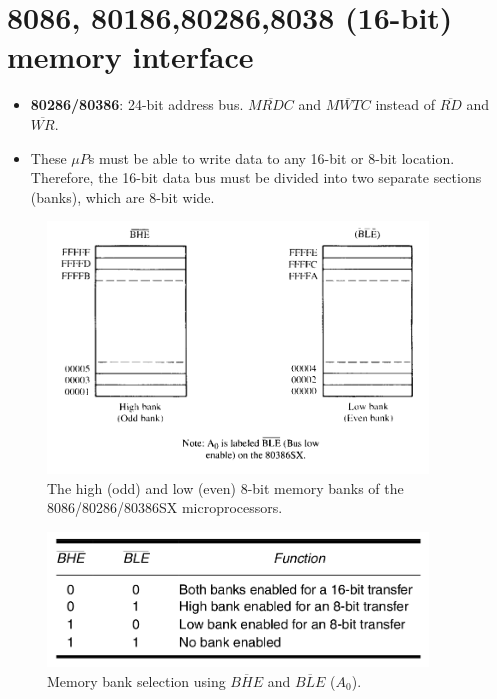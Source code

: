 \section{8086, 80186,80286,8038 (16-bit) memory interface}
\begin{itemize}
  \item \textbf{80286/80386}: 24-bit address bus. $\overline{MRDC}$ and $\overline{MWTC}$ instead of $\overline{RD}$ and $\overline{WR}$.
  \item These $\mu P$s must be able to write data to any 16-bit or 8-bit location. Therefore, the 16-bit data bus must be divided into two separate sections (banks), which are 8-bit wide.
\end{itemize}

\begin{figure}[h!]
  \centering
    \includegraphics[width=0.9\textwidth]{./figures/Bank_Enable.png}
    \caption{The high (odd) and low (even) 8-bit memory banks of the 8086/80286/80386SX microprocessors.}
    \label{fig:BHE}
\end{figure}
\newpage
\begin{figure}[h!]
  \centering
    \includegraphics[width=0.9\textwidth]{./figures/Bank_Table.png}
    \caption{Memory bank selection using $\overline{BHE}$ and $\overline{BLE}$ ($A_0$).}
    \label{fig:BHE_Table}
\end{figure}

